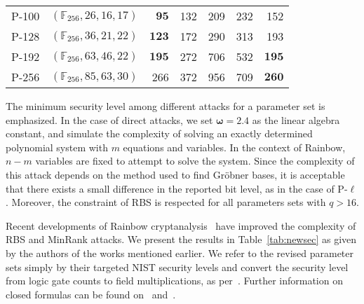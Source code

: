 \documentclass[12pt, a4paper, oneside]{memoir}
\theoremstyle{definition}
\begin{document}
\begin{table}[htbp]
\begin{tabular}{*{2}{l}*{5}{r}}
    P-100  & $(\mathbb{F}_{256}, 26, 16, 17)$  &  $\mathbf{  95}$ &              132 &              209 &              232 &              152 \\
    P-128  & $(\mathbb{F}_{256}, 36, 21, 22)$  &  $\mathbf{ 123}$ &              172 &              290 &              313 &              193 \\
    P-192  & $(\mathbb{F}_{256}, 63, 46, 22)$  &  $\mathbf{ 195}$ &              272 &              706 &              532 &  $\mathbf{ 195}$ \\
    P-256  & $(\mathbb{F}_{256}, 85, 63, 30)$  &              266 &              372 &              956 &              709 &  $\mathbf{ 260}$ \\
    \bottomrule
  \end{tabular}
\end{table}

The minimum security level among different attacks for a parameter set is emphasized. In the case of direct attacks, we set $\bm{\omega} = 2.4$ as the linear algebra constant, and simulate the complexity of solving an exactly determined polynomial system with $m$ equations and variables. In the context of Rainbow, $n - m$ variables are fixed to attempt to solve the system. Since the complexity of this attack depends on the method used to find Gröbner bases, it is acceptable that there exists a small difference in the reported bit level, as in the case of P-$\ell$. Moreover, the constraint of RBS is respected for all parameters sets with $q > 16$.

Recent developments of Rainbow cryptanalysis~\cite{Ding:202006} have improved the complexity of RBS and MinRank attacks. We present the results in Table~\ref{tab:newsec} as given by the authors of the works mentioned earlier. We refer to the revised parameter sets simply by their targeted NIST security levels and convert the security level from logic gate counts to field multiplications, as per~\cite[p.~35]{Ding:201901}. Further information on closed formulas can be found on~\cite[Eq.~19]{Nakamura:202006} and~\cite[Sec.~5]{Nakamura:202007}.
\end{document}
